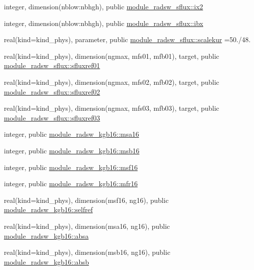 \begin{DoxyCompactItemize}
\item 
integer, dimension(nblow\+:nbhgh), public \hyperlink{group__module__radsw__main_ga92703c3e826f7e81267c6b7ae31ebe42}{module\+\_\+radsw\+\_\+sflux\+::ix2}
\item 
integer, dimension(nblow\+:nbhgh), public \hyperlink{group__module__radsw__main_gacb1498ecf044449dbe6d7a5630fdc375}{module\+\_\+radsw\+\_\+sflux\+::ibx}
\item 
real(kind=kind\+\_\+phys), parameter, public \hyperlink{group__module__radsw__main_ga2f3280a36f27cea89fc66d71e799cf6d}{module\+\_\+radsw\+\_\+sflux\+::scalekur} =50./48.
\item 
real(kind=kind\+\_\+phys), dimension(ngmax, mfs01, mfb01), target, public \hyperlink{group__module__radsw__main_ga84205f359fb3e1a0e1d03e755c52dc78}{module\+\_\+radsw\+\_\+sflux\+::sfluxref01}
\item 
real(kind=kind\+\_\+phys), dimension(ngmax, mfs02, mfb02), target, public \hyperlink{group__module__radsw__main_gaa57fca862289bd57327b9c3ef27e3e2f}{module\+\_\+radsw\+\_\+sflux\+::sfluxref02}
\item 
real(kind=kind\+\_\+phys), dimension(ngmax, mfs03, mfb03), target, public \hyperlink{group__module__radsw__main_ga95d2640cf0e6cf0ba4a8ca1758806e48}{module\+\_\+radsw\+\_\+sflux\+::sfluxref03}
\item 
integer, public \hyperlink{namespacemodule__radsw__kgb16_ad76a9d79e77228ac93ec3db96eed2b29}{module\+\_\+radsw\+\_\+kgb16\+::msa16}
\item 
integer, public \hyperlink{group__module__radsw__main_ga2ce1ab36897fb1fc7d85cbf7fe539e59}{module\+\_\+radsw\+\_\+kgb16\+::msb16}
\item 
integer, public \hyperlink{group__module__radsw__main_gab35df3f7d231e98fbef5738119138907}{module\+\_\+radsw\+\_\+kgb16\+::msf16}
\item 
integer, public \hyperlink{group__module__radsw__main_gaeee3fe8e44f6fbd9a6a008bc9f97f37c}{module\+\_\+radsw\+\_\+kgb16\+::mfr16}
\item 
real(kind=kind\+\_\+phys), dimension(msf16, ng16), public \hyperlink{group__module__radsw__main_ga77d98f3fb766d4abfd494332ce67c2c2}{module\+\_\+radsw\+\_\+kgb16\+::selfref}
\item 
real(kind=kind\+\_\+phys), dimension(msa16, ng16), public \hyperlink{group__module__radsw__main_ga51fe40b5f24cc461850fe5be40d18869}{module\+\_\+radsw\+\_\+kgb16\+::absa}
\item 
real(kind=kind\+\_\+phys), dimension(msb16, ng16), public \hyperlink{group__module__radsw__main_gafe8639128e4f7a48f133b7399addcb79}{module\+\_\+radsw\+\_\+kgb16\+::absb}

\end{DoxyCompactItemize}
